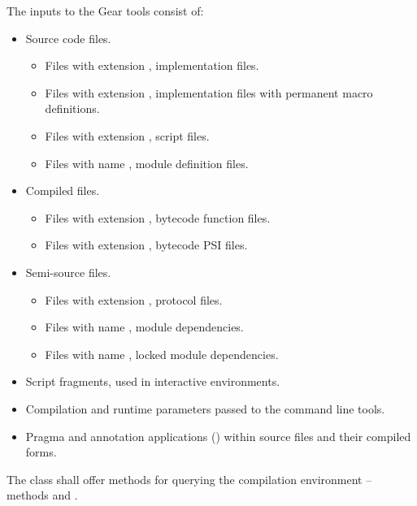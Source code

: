 The inputs to the Gear tools consist of: 
\begin{itemize}
  \item Source code files. 
    \begin{itemize}
      \item Files with extension , implementation files. 
      \item Files with extension , implementation files with permanent macro definitions. 
      \item Files with extension , script files. 
      \item Files with name , module definition files. 
    \end{itemize}
  \item Compiled files. 
    \begin{itemize}
      \item Files with extension , bytecode function files. 
      \item Files with extension , bytecode PSI files. 
    \end{itemize}
  \item Semi-source files. 
    \begin{itemize}
      \item Files with extension , protocol files. 
      \item Files with name , module dependencies. 
      \item Files with name , locked module dependencies. 
    \end{itemize}
  \item Script fragments, used in interactive environments. 
  \item Compilation and runtime parameters passed to the command line tools. 
  \item Pragma and annotation applications () within source files and their compiled forms. 
\end{itemize}

The  class shall offer methods for querying the compilation environment -- methods  and .

